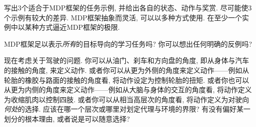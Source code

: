 \begin{exer}
写出3个适合于MDP框架的任务示例, 并给出各自的状态、动作与奖赏. 尽可能使3个示例有较大的差异. MDP框架抽象而灵活, 可以以多种方式使用. 在至少一个实例中以某种方式逼近MDP框架的极限.
\end{exer}

\begin{exer}
MDP框架足以表示\emph{所有}的目标导向的学习任务吗? 你可以想出任何明确的反例吗?
\end{exer}

\begin{exer}
现在考虑关于驾驶的问题. 你可以从油门、刹车和方向盘的角度, 即从身体与汽车的接触的角度, 来定义动作. 或者你可以从更为外侧的角度来定义动作——例如从轮胎的橡胶与路面的接触的角度看, 将动作设定为控制轮胎的扭矩. 或者你也可以从更为内侧的角度来定义动作——例如从大脑与身体的交互的角度看, 将动作定义为收缩肌肉以控制四肢. 或者你可以从相当高层次的角度看, 将动作定义为对驶向\emph{何处}的选择. 应该在哪一个层次或哪里对划定代理与环境的界限? 有没有偏好某一划分的根本理由, 或者说是可以随意选择?
\end{exer}

